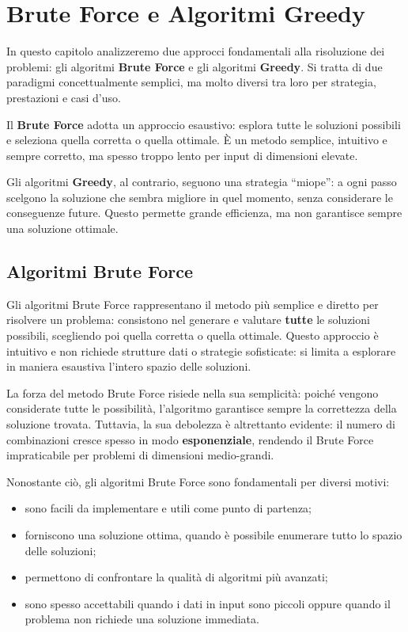
\chapter{Brute Force e Algoritmi Greedy}


In questo capitolo analizzeremo due approcci fondamentali alla risoluzione dei problemi: 
gli algoritmi \textbf{Brute Force} e gli algoritmi \textbf{Greedy}.  
Si tratta di due paradigmi concettualmente semplici, ma molto diversi tra loro per strategia, 
prestazioni e casi d’uso.

Il \textbf{Brute Force} adotta un approccio esaustivo: esplora tutte le soluzioni possibili 
e seleziona quella corretta o quella ottimale. È un metodo semplice, intuitivo e sempre corretto, 
ma spesso troppo lento per input di dimensioni elevate.

Gli algoritmi \textbf{Greedy}, al contrario, seguono una strategia “miope”: 
a ogni passo scelgono la soluzione che sembra migliore in quel momento, 
senza considerare le conseguenze future.  
Questo permette grande efficienza, ma non garantisce sempre una soluzione ottimale.

\section{Algoritmi Brute Force}

Gli algoritmi Brute Force rappresentano il metodo più semplice e diretto per risolvere un problema: 
consistono nel generare e valutare \textbf{tutte} le soluzioni possibili, scegliendo poi quella corretta 
o quella ottimale. Questo approccio è intuitivo e non richiede strutture dati o strategie sofisticate: 
si limita a esplorare in maniera esaustiva l’intero spazio delle soluzioni.

La forza del metodo Brute Force risiede nella sua semplicità: poiché vengono considerate tutte le possibilità, 
l’algoritmo garantisce sempre la correttezza della soluzione trovata. Tuttavia, la sua debolezza è altrettanto 
evidente: il numero di combinazioni cresce spesso in modo \textbf{esponenziale}, rendendo il Brute Force 
impraticabile per problemi di dimensioni medio-grandi.

Nonostante ciò, gli algoritmi Brute Force sono fondamentali per diversi motivi:
\begin{itemize}
	\item sono facili da implementare e utili come punto di partenza;
	\item forniscono una soluzione ottima, quando è possibile enumerare tutto lo spazio delle soluzioni;
	\item permettono di confrontare la qualità di algoritmi più avanzati;
	\item sono spesso accettabili quando i dati in input sono piccoli oppure quando il problema non richiede 
	una soluzione immediata.
\end{itemize}








